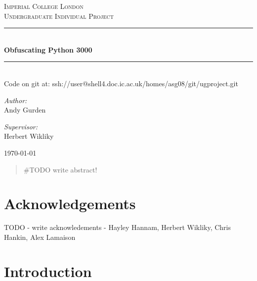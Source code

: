 \documentclass[twoside,a4paper]{report}
\newcommand{\HRule}{\rule{\linewidth}{0.5mm}}
\begin{document}
\begin{titlepage}

\begin{center}

\textsc{\LARGE Imperial College London}\\[1.5cm]
\textsc{\Large Undergraduate Individual Project}\\[0.5cm]

\HRule \\[0.4cm]
{\huge \bfseries Obfuscating Python 3000} \\[0.4cm]
\HRule \\[0.4cm]

Code on git at: ssh://user@shell4.doc.ic.ac.uk/homes/asg08/git/ugproject.git \\[1.5cm]

\begin{minipage}{0.4\textwidth}
\begin{flushleft} \large
\emph{Author:}\\
Andy Gurden
\end{flushleft}
\end{minipage}
\begin{minipage}{0.4\textwidth}
\begin{flushright} \large
\emph{Supervisor:} \\
Herbert Wikliky
\end{flushright}
\end{minipage}

\vfill

{\large \today}

\end{center}
\end{titlepage}

\begin{abstract}
\#TODO write abstract!
\end{abstract}

\section*{Acknowledgements}

TODO - write acknowledements - Hayley Hannam, Herbert Wikliky, Chris Hankin, Alex Lamaison

\tableofcontents

\clearpage

\section{Introduction}
\end{document}
